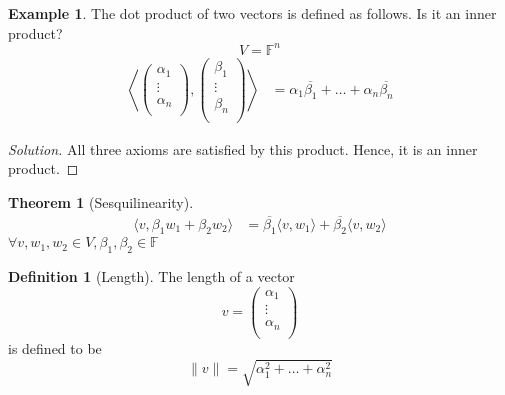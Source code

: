 \documentclass[fleqn, a4paper, 12pt]{article}
\theoremstyle{definition}
\newtheorem{example}{Example} %
\newtheorem{definition}{Definition} %
\theoremstyle{theorem}
\newtheorem{theorem}{Theorem} %
\theoremstyle{remark}
\newenvironment{solution} %
	{\begin{proof}[Solution]\let\qed\relax}
	{\end{proof}}
\numberwithin{corollary}{theorem}
\numberwithin{equation}{theorem}
\begin{document}
\begin{example}
	The dot product of two vectors is defined as follows. Is it an inner product?
	\begin{equation*}
		V = \mathbb{F}^n
	\end{equation*}
	\begin{align*}
		\left\langle
			\begin{pmatrix}
				\alpha_1\\
				\vdots\\
				\alpha_n\\
			\end{pmatrix}
			,
			\begin{pmatrix}
				\beta_1\\
				\vdots\\
				\beta_n\\
			\end{pmatrix}
		\right\rangle
		&= \alpha_1 \overline{\beta_1} + \dots + \alpha_n \overline{\beta_n}
	\end{align*}
\end{example}

\begin{solution}
	All three axioms are satisfied by this product. Hence, it is an inner product.
\end{solution}

\begin{theorem}[Sesquilinearity]
	\begin{align*}
		\langle v, \beta_1 w_1 + \beta_2 w_2 \rangle &= \overline{\beta_1} \langle v, w_1 \rangle + \overline{\beta_2} \langle v, w_2 \rangle
	\end{align*}
	$\forall v, w_1, w_2 \in V, \beta_1, \beta_2 \in \mathbb{F}$
\end{theorem}

\begin{definition}[Length]
	The length of a vector 
	\begin{equation*}
		v = 
			\begin{pmatrix}
				\alpha_1\\
				\vdots\\
				\alpha_n\\
			\end{pmatrix}
	\end{equation*}
	is defined to be 
	\begin{equation*}
		\| v \| = \sqrt{\alpha_1 ^2 + \dots + \alpha_n ^2}
	\end{equation*}
\end{definition}
\end{document}
